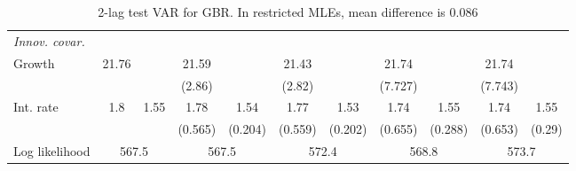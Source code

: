 \begin{table}[htbp]
\begin{tabular}{@{\extracolsep{4pt}}lcccccccccc@{}}
\rule{0pt}{4ex} \emph{Innov. covar.}  	 & 	 & 	 & 	 & 	 & 	 & 	 & 	 & 	 & 	 &\\ 
\quad Growth 	 &21.76 	 &  	 & 21.59 	 &  	 & 21.43 	 &  	 & 21.74 	 &  	 & 21.74 	 & 	 \\ 
 		 &  	 &  	 & (2.86) 	 &  	 & (2.82) 	 &  	 & (7.727) 	 &  	 & (7.743) 	 &  	 \\ 
\quad Int. rate 	 &1.8 	 & 1.55 	 & 1.78 	 & 1.54 	 & 1.77 	 & 1.53 	 & 1.74 	 & 1.55 	 & 1.74 	 & 1.55	 \\ 
 		 &  	 &  	 & (0.565) 	 & (0.204) 	 & (0.559) 	 & (0.202) 	 & (0.655) 	 & (0.288) 	 & (0.653) 	 & (0.29) 	 \\ 
 \hline \rule{0pt}{4ex} 
  Log likelihood 	 &\multicolumn{2}{c}{567.5} 	 & \multicolumn{2}{c}{567.5} 	 & \multicolumn{2}{c}{572.4} 	 & \multicolumn{2}{c}{568.8} 	 & \multicolumn{2}{c}{573.7}\\ 

 \hline 	\end{tabular}		\caption{2-lag test VAR for GBR. In restricted MLEs, mean difference is 0.086}
		\label{tab:GBR2lag}

\end{table}